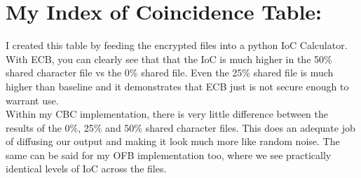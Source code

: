 \documentclass[10pt]{article}
\begin{document}
\section{My Index of Coincidence Table:}
\noindent I created this table by feeding the encrypted files into a python IoC Calculator. With ECB, you can clearly see that that the IoC is much higher in the 50\% shared character file vs the 0\% shared file. Even the 25\% shared file is much higher than baseline and it demonstrates that ECB just is not secure enough to warrant use. \\
Within my CBC implementation, there is very little difference between the results of the 0\%, 25\% and 50\% shared character files. This does an adequate job of diffusing our output and making it look much more like random noise. The same can be said for my OFB implementation too, where we see practically identical levels of IoC across the files.\\
\\
\vspace{0.2in}\\
\end{document}
